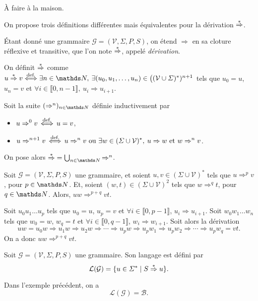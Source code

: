 \begin{prv}
	À faire à la maison.
\end{prv}

On propose trois définitions différentes mais équivalentes pour la dérivation $\mathrel{\overset*\Rightarrow}$.

\begin{defn}
	Étant donné une grammaire $\mathcal{G} = (\mathcal{V}, \Sigma, P, S)$, on étend $\Rightarrow$ en sa cloture réflexive et transitive, que l'on note $\mathrel{\overset*\Rightarrow}$, appelé \textit{dérivation}.
	
\end{defn}

\begin{defn}
	On définit $\mathrel{\overset*\Rightarrow}$ comme $u \Rst v {\ds\iffdef} \exists n \in \N,\:\exists (u_0,u_1,\ldots,u_n) \in \big((\mathcal{V} \cup \Sigma)^*)^{n+1}$ tels que $u_0 = u$, $u_n = v$ et $\forall i \in \llbracket 0,n-1 \rrbracket,\: u_i \Rightarrow u_{i+1}$.
\end{defn}


\begin{defn}
	Soit la suite $(\Rightarrow^n)_{n\in\N}$ définie inductivement par
	\begin{itemize}
		\item $\displaystyle u \Rightarrow^0 v \mathop{\iff}^{\text{def.}} u = v$,
		\item $\displaystyle u \Rightarrow^{n+1} v \mathop{\iff}^{\text{def.}} u\Rightarrow^n v \text{ ou } \exists w \in (\varSigma \cup \mathcal{V})^*,\: u \Rightarrow w \text{ et } w \Rightarrow^n v$.
	\end{itemize}
	On pose alors $\mathord{\Rst} = \bigcup_{n \in \N} \mathord{\Rightarrow^n}$.
\end{defn}

\begin{lem}[de composition$^*$]
	Soit $\mathcal{G} = (\mathcal{V}, \Sigma, P, S)$ une grammaire, et soient $u, v \in (\Sigma \cup \mathcal{V})^*$ tels que $u \Rightarrow^p v$, pour $p \in \N$.
	Et, soient $(w,t) \in (\Sigma \cup \mathcal{V})^2$ tels que $w \Rightarrow^q t$, pour $q \in \N$.
	Alors, $uw \Rightarrow^{p+q} vt$.
\end{lem}

\begin{prv}
	Soit $u_0u_1\ldots u_p$ tels que $u_0 = u$, $u_p = v$ et $\forall i \in \llbracket 0,p-1 \rrbracket$, $u_i \Rightarrow u_{i+1}$.
	Soit $w_0w_1\ldots w_n$ tels que $w_0 = w$, $w_q = t$ et $\forall i \in \llbracket 0,q-1 \rrbracket$, $w_i \Rightarrow w_{i+1}$.
	Soit alors la dérivation \[
		uw = u_0 w \Rightarrow u_1 w \Rightarrow u_2 w \Rightarrow \cdots \Rightarrow u_p w \Rightarrow u_p w_1 \Rightarrow u_p w_2 \Rightarrow \cdots \Rightarrow u_p w_q = vt
	.\]
	On a donc $uw \Rightarrow^{p+q} vt$.
\end{prv}

\begin{defn}
	Soit $\mathcal{G} = (\mathcal{V}, \Sigma, P, S)$ une grammaire. Son langage est défini par \[
		\mathcal{L}(\mathcal{G}) = \{u \in \varSigma^*  \mid S \mathrel{\overset*\Rightarrow} u\}
	.\]
\end{defn}

\begin{exm}
	Dans l'exemple précédent, on a \[
		\mathcal{L}(\mathcal{G}) = \mathcal{B}
	.\] 
\end{exm}
